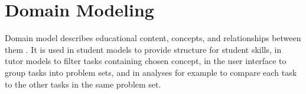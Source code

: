 

\section{Domain Modeling}
\label{sec:domain-modeling}

Domain model describes educational content, concepts, and relationships
between them
\cite{its-domain-models}.
It is used in student models to provide structure
for student skills, in tutor models to filter tasks containing chosen
concept, in the user interface to group tasks into problem sets, and in
analyses for example to compare each task to the other tasks in the same problem set.

